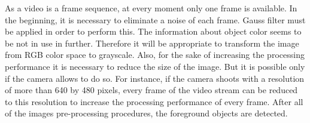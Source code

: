 \documentclass[12pt,a4paper,oneside,titlepage]{article}
\begin{document}
As a video is a frame sequence, at every moment only one frame is available.
In the beginning, it is necessary to eliminate a noise of each frame.
Gauss filter must be applied in order to perform this.
The information about object color seems to be not in use in further.
Therefore it will be appropriate to transform the image from RGB color space to grayscale.
Also, for the sake of increasing the processing performance it is necessary to reduce the size of the image.
But it is possible only if the camera allows to do so.
For instance, if the camera shoots with a resolution of more than 640 by 480 pixels, every frame of the video stream can be reduced to this resolution to increase the processing performance of every frame.
After all of the images pre-processing procedures, the foreground objects are detected.
\end{document}
